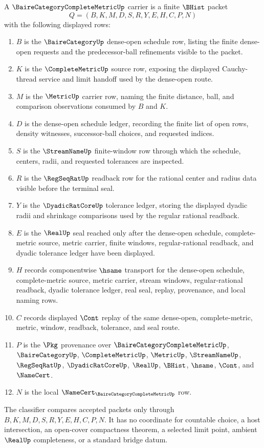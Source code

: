 \begin{definition}
\label{def:baire-category-complete-metric-carrier}
A $\BaireCategoryCompleteMetricUp$ carrier is a finite $\BHist$ packet
$$
Q=(B,K,M,D,S,R,Y,E,H,C,P,N)
$$
with the following displayed rows:
\begin{enumerate}
\item $B$ is the $\BaireCategoryUp$ dense-open schedule row, listing the finite dense-open requests and the predecessor-ball refinements visible to the packet.
\item $K$ is the $\CompleteMetricUp$ source row, exposing the displayed Cauchy-thread service and limit handoff used by the dense-open route.
\item $M$ is the $\MetricUp$ carrier row, naming the finite distance, ball, and comparison observations consumed by $B$ and $K$.
\item $D$ is the dense-open schedule ledger, recording the finite list of open rows, density witnesses, successor-ball choices, and requested indices.
\item $S$ is the $\StreamNameUp$ finite-window row through which the schedule, centers, radii, and requested tolerances are inspected.
\item $R$ is the $\RegSeqRatUp$ readback row for the rational center and radius data visible before the terminal seal.
\item $Y$ is the $\DyadicRatCoreUp$ tolerance ledger, storing the displayed dyadic radii and shrinkage comparisons used by the regular rational readback.
\item $E$ is the $\RealUp$ seal reached only after the dense-open schedule, complete-metric source, metric carrier, finite windows, regular-rational readback, and dyadic tolerance ledger have been displayed.
\item $H$ records componentwise $\hsame$ transport for the dense-open schedule, complete-metric source, metric carrier, stream windows, regular-rational readback, dyadic tolerance ledger, real seal, replay, provenance, and local naming rows.
\item $C$ records displayed $\Cont$ replay of the same dense-open, complete-metric, metric, window, readback, tolerance, and seal route.
\item $P$ is the $\Pkg$ provenance over $\BaireCategoryCompleteMetricUp$, $\BaireCategoryUp$, $\CompleteMetricUp$, $\MetricUp$, $\StreamNameUp$, $\RegSeqRatUp$, $\DyadicRatCoreUp$, $\RealUp$, $\BHist$, $\hsame$, $\Cont$, and $\NameCert$.
\item $N$ is the local $\NameCert_{\BaireCategoryCompleteMetricUp}$ row.
\end{enumerate}
The classifier compares accepted packets only through $B,K,M,D,S,R,Y,E,H,C,P,N$. It has no coordinate for countable choice, a host intersection, an open-cover compactness theorem, a selected limit point, ambient $\RealUp$ completeness, or a standard bridge datum.
\end{definition}

